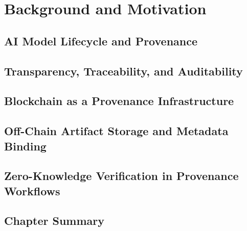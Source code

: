 \chapter{Background and Motivation}
\section{AI Model Lifecycle and Provenance}
\section{Transparency, Traceability, and Auditability}
\section{Blockchain as a Provenance Infrastructure}
\section{Off-Chain Artifact Storage and Metadata Binding}
\section{Zero-Knowledge Verification in Provenance Workflows}
\section{Chapter Summary}
